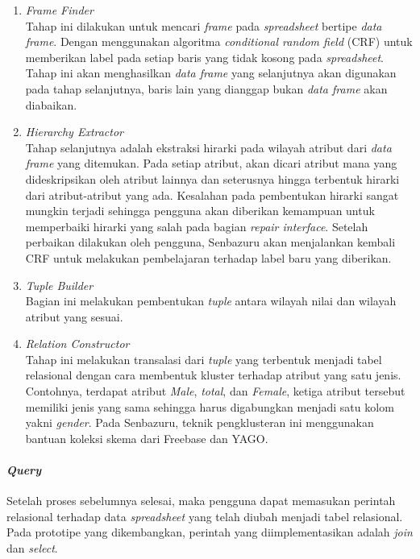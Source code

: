 \begin{enumerate}
    \item \textit{Frame Finder}\\
          Tahap ini dilakukan untuk mencari \textit{frame} pada \textit{spreadsheet} bertipe \textit{data frame}. Dengan menggunakan algoritma \textit{conditional random field} (CRF) untuk memberikan label pada setiap baris yang tidak kosong pada \textit{spreadsheet}. Tahap ini akan menghasilkan \textit{data frame} yang selanjutnya akan digunakan pada tahap selanjutnya, baris lain yang dianggap bukan \textit{data frame} akan diabaikan.

    \item \textit{Hierarchy Extractor}\\
          Tahap selanjutnya adalah ekstraksi hirarki pada wilayah atribut dari \textit{data frame} yang ditemukan. Pada setiap atribut, akan dicari atribut mana yang dideskripsikan oleh atribut lainnya dan seterusnya hingga terbentuk hirarki dari atribut-atribut yang ada. Kesalahan pada pembentukan hirarki sangat mungkin terjadi sehingga pengguna akan diberikan kemampuan untuk memperbaiki hirarki yang salah pada bagian \textit{repair interface}. Setelah perbaikan dilakukan oleh pengguna, Senbazuru akan menjalankan kembali CRF untuk melakukan pembelajaran terhadap label baru yang diberikan.

    \item \textit{Tuple Builder}\\
          Bagian ini melakukan pembentukan \textit{tuple} antara wilayah nilai dan wilayah atribut yang sesuai.

    \item \textit{Relation Constructor}\\
          Tahap ini melakukan transalasi dari \textit{tuple} yang terbentuk menjadi tabel relasional dengan cara membentuk kluster terhadap atribut yang satu jenis. Contohnya, terdapat atribut \textit{Male}, \textit{total}, dan \textit{Female}, ketiga atribut tersebut memiliki jenis yang sama sehingga harus digabungkan menjadi satu kolom yakni \textit{gender}. Pada Senbazuru, teknik pengklusteran ini menggunakan bantuan koleksi skema dari Freebase dan YAGO.
\end{enumerate}

\paragraph{\textit{Query}}
Setelah proses sebelumnya selesai, maka pengguna dapat memasukan perintah relasional terhadap data \textit{spreadsheet} yang telah diubah menjadi tabel relasional. Pada prototipe yang dikembangkan, perintah yang diimplementasikan adalah \textit{join} dan \textit{select}.

